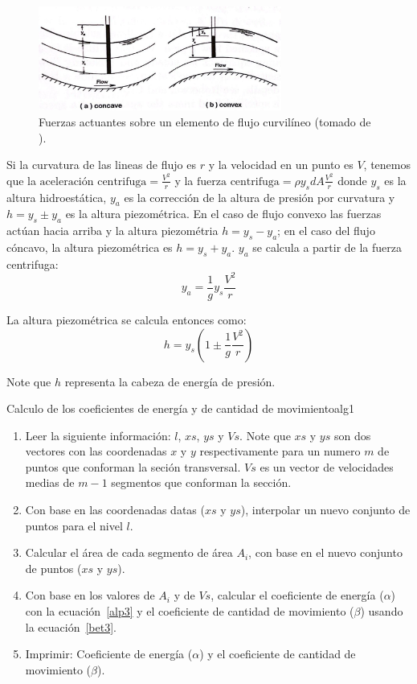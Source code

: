 \documentclass[11pt, oneside]{article}
\begin{document}
\begin{figure}[h]
\centering
\includegraphics[width=8cm]{fig8.jpeg}
\caption{Fuerzas actuantes sobre un elemento de flujo curvil\'ineo (tomado de \cite{Chau}).}
\label{fig8}
\end{figure}

Si la curvatura de las lineas de flujo es $r$ y la velocidad en un punto es  $V$, tenemos que la $\text{aceleración centrifuga}= \frac{V^2}{r}$ y la $\text{fuerza centrifuga}= \rho y_s dA \frac{V^2}{r}$ donde $y_s$ es la altura hidroest\'atica, $y_a$ es la corrección de la altura de presi\'on por curvatura y $h = y_s \pm y_a$ es la altura piezom\'etrica. En el caso de flujo convexo las fuerzas actúan hacia arriba y la altura piezom\'etria $h = y_s-y_a$; en el caso del flujo cóncavo, la altura piezom\'etrica es $h = y_s+y_a$. $y_a$ se calcula a partir de la fuerza centrifuga:
$$
y_a = \frac{1}{g}y_s \frac{V^2}{r}
$$

La altura piezom\'etrica se calcula entonces como:
$$
h = y_s \left( 1 \pm \frac{1}{g} \frac{V^2}{r} \right)
$$

Note que $h$ representa la cabeza de energ\'ia de presi\'on. 

\begin{alg}{Calculo de los coeficientes de energ\'ia y de cantidad de movimiento}{alg1}
\begin{enumerate}
\item Leer la siguiente informaci\'on: $l$, $xs$, $ys$ y $Vs$. Note que $xs$ y $ys$ son dos vectores con las coordenadas $x$ y $y$ respectivamente para un numero $m$ de puntos que conforman la seci\'on transversal. $Vs$ es un vector de velocidades medias de $m-1$ segmentos que conforman la secci\'on.
\item Con base en las coordenadas datas ($xs$ y $ys$), interpolar un nuevo conjunto de puntos para el nivel $l$.   
\item Calcular el \'area de cada segmento de \'area $A_i$, con base en el nuevo conjunto de puntos ($xs$ y $ys$).
\item Con base en los valores de $A_i$ y de $Vs$, calcular el coeficiente de energ\'ia ($\alpha$) con la ecuaci\'on~\ref{alp3} y el coeficiente de cantidad de movimiento ($\beta$) usando la ecuaci\'on~\ref{bet3}.
\item Imprimir: Coeficiente de energ\'ia ($\alpha$) y el coeficiente de cantidad de movimiento ($\beta$). 
\end{enumerate}
\end{alg}
\end{document}
